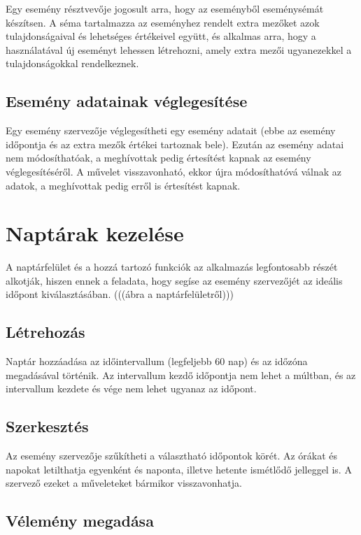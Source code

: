 \documentclass[a4paper,12pt]{report}
\theoremstyle{definition}
\theoremstyle{remark}
\begin{document}
Egy esemény résztvevője jogosult arra, hogy az eseményből eseménysémát készítsen. A séma tartalmazza az eseményhez rendelt extra mezőket azok tulajdonságaival és lehetséges értékeivel együtt, és alkalmas arra, hogy a használatával új eseményt lehessen létrehozni, amely extra mezői ugyanezekkel a tulajdonságokkal rendelkeznek.

	\subsection{Esemény adatainak véglegesítése}

Egy esemény szervezője véglegesítheti egy esemény adatait (ebbe az esemény időpontja és az extra mezők értékei tartoznak bele).  Ezután az esemény adatai nem módosíthatóak, a meghívottak pedig értesítést kapnak az esemény véglegesítéséről. A művelet visszavonható, ekkor újra módosíthatóvá válnak az adatok, a meghívottak pedig erről is értesítést kapnak.

\section{Naptárak kezelése}

A naptárfelület és a hozzá tartozó funkciók az alkalmazás legfontosabb részét alkotják, hiszen ennek a feladata, hogy segíse az esemény szervezőjét az ideális időpont kiválasztásában. (((ábra a naptárfelületről)))

	\subsection{Létrehozás}

Naptár hozzáadása az időintervallum (legfeljebb 60 nap) és az időzóna megadásával történik. Az intervallum kezdő időpontja nem lehet a múltban, és az intervallum kezdete és vége nem lehet ugyanaz az időpont.

	\subsection{Szerkesztés}

Az esemény szervezője szűkítheti a választható időpontok körét. Az órákat és napokat letilthatja egyenként és naponta, illetve hetente ismétlődő jelleggel is. A szervező ezeket a műveleteket bármikor visszavonhatja.

	\subsection{Vélemény megadása}
\end{document}
